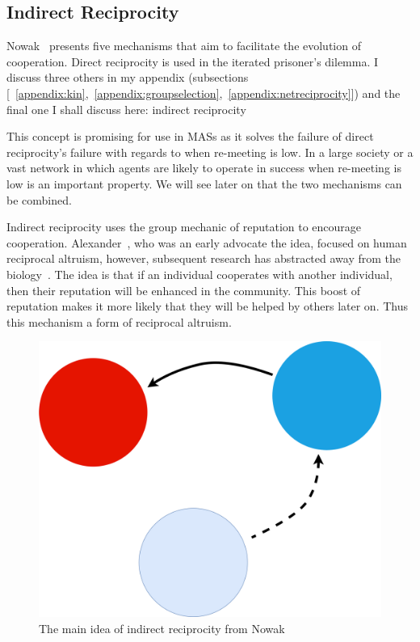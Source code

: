 \documentclass[]{final_report}
\begin{document}
\subsection{Indirect Reciprocity}
\label{sec:indir}
Nowak~\cite{five_rules_coop} presents five mechanisms that aim to facilitate the evolution of cooperation. Direct reciprocity is used in the iterated prisoner's dilemma. I discuss three others in my appendix (subsections [~\ref{appendix:kin},~\ref{appendix:groupselection},~\ref{appendix:netreciprocity}]) and the final one I shall discuss here: indirect reciprocity\par
This concept is promising for use in MASs as it solves the failure of direct reciprocity's failure with regards to when re-meeting is low. In a large society or a vast network in which agents are likely to operate in success when re-meeting is low is an important property. We will see later on that the two mechanisms can be combined.\par
Indirect reciprocity uses the group mechanic of reputation to encourage cooperation. Alexander~\cite{alexander1987biology}, who was an early advocate the idea, focused on human reciprocal altruism, however, subsequent research has abstracted away from the biology~\cite{phelps_game_theoretic_analysis, imagevsstanding, evol_indirect_image, evoldirindir, five_rules_coop, leimarhammer, sugden2004economics, gossip_alt, mui2002computational}. The idea is that if an individual cooperates with another individual, then their reputation will be enhanced in the community. This boost of reputation makes it more likely that they will be helped by others later on. Thus this mechanism a form of reciprocal altruism.\par
\begin{figure}
\vspace{-20pt}
\begin{framed}
	\center
	\includegraphics[width=\textwidth]{IndirectRec.png}
	\caption{The main idea of indirect reciprocity from Nowak~\cite{five_rules_coop}}
	\label{fig:indir_rec}
\end{framed}
\vspace{-20pt}
\end{figure}
\end{document}
